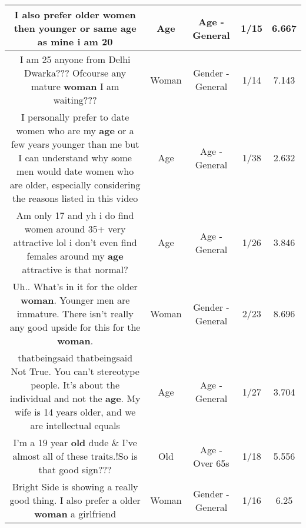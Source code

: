 \documentclass[11pt]{article}
\newlength\mylength
\begin{document}
\begin{center}
\begin{longtable}{|C{.65\mylength}|C{.30\mylength}|C{.12\mylength}|C{.12\mylength}|C{.12\mylength}|}
  \small I also prefer older women then younger or same \textbf{age} as mine i am 20\normalsize   & Age & Age - General & 1/15 & 6.667 \\  \hline
  \small I am 25 anyone from Delhi Dwarka??? Ofcourse any mature \textbf{woman} I am waiting???\normalsize   & Woman & Gender - General & 1/14 & 7.143 \\  \hline
  \small I personally prefer to date women who are my \textbf{age} or a few years younger than me but I can understand why some men would date women who are older, especially considering the reasons listed in this video\normalsize   & Age & Age - General & 1/38 & 2.632 \\  \hline
  \small Am only 17 and yh i do find women around 35+ very attractive lol  i don't even find females around my \textbf{age} attractive is that normal?\normalsize   & Age & Age - General & 1/26 & 3.846 \\  \hline
  \small Uh.. What's in it for the older \textbf{woman}. Younger men are immature. There isn't really any good upside for this for the \textbf{woman}.\normalsize   & Woman & Gender - General & 2/23 & 8.696 \\  \hline
  \small thatbeingsaid thatbeingsaid Not True. You can't stereotype people. It's about the individual and not the \textbf{age}. My wife is 14 years older, and we are intellectual equals\normalsize   & Age & Age - General & 1/27 & 3.704 \\  \hline
  \small I'm a 19 year \textbf{old} dude \& I've almost all of these traits.!So is that good sign???\normalsize   & Old & Age - Over 65s & 1/18 & 5.556 \\  \hline
  \small Bright Side is showing a really good thing. I also prefer a older \textbf{woman} a girlfriend\normalsize   & Woman & Gender - General & 1/16 & 6.25 \\  \hline

\end{longtable}
\end{center}
\end{document}
